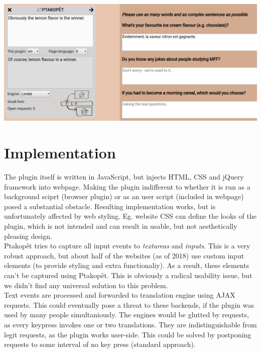 \documentclass[a4paper]{article}
\begin{document}
\vspace{1cm}
\begin{center}
\includegraphics[width=\textwidth]{screenshot_3}
\end{center}

\section*{Implementation}
The plugin itself is written in JavaScript, but injects HTML, CSS and jQuery framework into webpage. Making the plugin indifferent to whether it is run as a background sciprt (browser plugin) or as an user script (included in webpage) posed a substantial obstacle. Resulting implementation works, but is unfortunately affected by web styling. Eg.  website CSS can define the looks of the plugin, which is not intended and can result in usable, but not aesthetically pleasing design. \\
Ptakopět tries to capture all input events to \textit{textareas} and \textit{inputs}. This is a very robust approach, but about half of the websites (as of 2018) use custom input elements (to provide styling and extra functionaliy). As a result, these elements can't be captured using Ptakopět. This is obviously a radical usability issue, but we didn't find any universal solution to this problem. \\
Text events are processed and forwarded to translation engine using AJAX requests. This could eventually pose a threat to these backends, if the plugin was used by many people simultaniously. The engines would be glutted by requests, as every keypress invokes one or two translations. They are indistinguishable from legit requests, as the plugin works user-side. This could be solved by postponing requests to some interval of no key press (standard approach).
\end{document}
